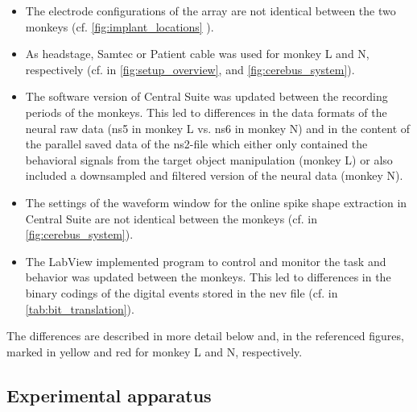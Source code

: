 {\begin{itemize}
 \item The electrode configurations of the array are not identical between the two monkeys (cf. \cref{fig:implant_locations} ).
 \item As headstage, Samtec or Patient cable was used for monkey L and N, respectively (cf. in \cref{fig:setup_overview}, and \cref{fig:cerebus_system}).
 \item The software version of Central Suite was updated between the recording periods of the monkeys. This led to differences in the data formats of the neural raw data (ns5 in monkey L vs. ns6 in monkey N) and in the content of the parallel saved data of the ns2-file which either only contained the behavioral signals from the target object manipulation (monkey L) or also included a downsampled and filtered version of the neural data (monkey N).
 \item The settings of the waveform window for the online spike shape extraction in Central Suite are not identical between the monkeys (cf. in \cref{fig:cerebus_system}).
 \item The LabView implemented program to control and monitor the task and behavior was updated between the monkeys. This led to differences in the binary codings of the digital events stored in the nev file (cf. in \cref{tab:bit_translation}).
\end{itemize}

The differences are described in more detail below and, in the referenced figures, marked in yellow and red for monkey L and N, respectively. 



\subsection{Experimental apparatus}
\label{sec:experimental_apparatus}

}
